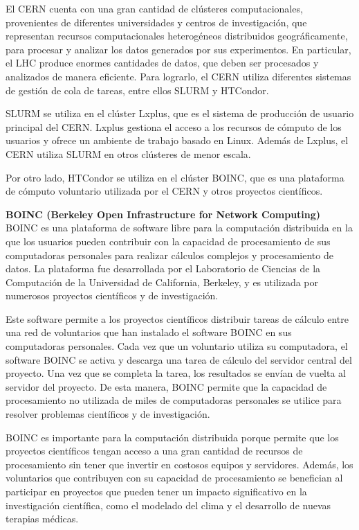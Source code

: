 \begin{spacing}{1.5}
\begin{multicols}{2}
  El CERN cuenta con una gran cantidad de clústeres computacionales, provenientes de diferentes universidades y centros de investigación, que representan recursos computacionales heterogéneos distribuidos geográficamente, para procesar y analizar los datos generados por sus experimentos. En particular, el LHC produce enormes cantidades de datos, que deben ser procesados y analizados de manera eficiente. Para lograrlo, el CERN utiliza diferentes sistemas de gestión de cola de tareas, entre ellos SLURM y HTCondor.

  SLURM se utiliza en el clúster Lxplus, que es el sistema de producción de usuario principal del CERN. Lxplus gestiona el acceso a los recursos de cómputo de los usuarios y ofrece un ambiente de trabajo basado en Linux. Además de Lxplus, el CERN utiliza SLURM en otros clústeres de menor escala.

  Por otro lado, HTCondor se utiliza en el clúster BOINC, que es una plataforma de cómputo voluntario utilizada por el CERN y otros proyectos científicos.

  \textbf{BOINC (Berkeley Open Infrastructure for Network Computing)}
  \newline
  BOINC es una plataforma de software libre para la computación distribuida en la que los usuarios pueden contribuir con la capacidad de procesamiento de sus computadoras personales para realizar cálculos complejos y procesamiento de datos. La plataforma fue desarrollada por el Laboratorio de Ciencias de la Computación de la Universidad de California, Berkeley, y es utilizada por numerosos proyectos científicos y de investigación.

  Este software permite a los proyectos científicos distribuir tareas de cálculo entre una red de voluntarios que han instalado el software BOINC en sus computadoras personales. Cada vez que un voluntario utiliza su computadora, el software BOINC se activa y descarga una tarea de cálculo del servidor central del proyecto. Una vez que se completa la tarea, los resultados se envían de vuelta al servidor del proyecto. De esta manera, BOINC permite que la capacidad de procesamiento no utilizada de miles de computadoras personales se utilice para resolver problemas científicos y de investigación.

  BOINC es importante para la computación distribuida porque permite que los proyectos científicos tengan acceso a una gran cantidad de recursos de procesamiento sin tener que invertir en costosos equipos y servidores. Además, los voluntarios que contribuyen con su capacidad de procesamiento se benefician al participar en proyectos que pueden tener un impacto significativo en la investigación científica, como el modelado del clima y el desarrollo de nuevas terapias médicas. \cite{BOINC-1}
  

\end{multicols}
\end{spacing}
